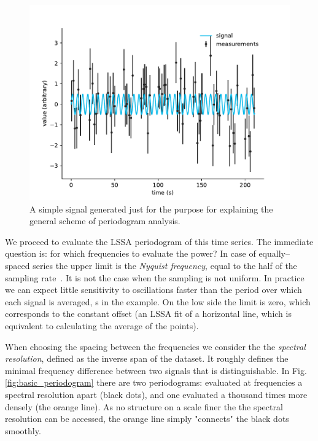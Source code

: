 \begin{figure}
  \centering \includegraphics[width=0.8\linewidth]{gfx/axions/basic_signal.pdf}
  \caption{A simple signal generated just for the purpose for explaining the general scheme of periodogram analysis.}
  \label{fig:basic_signal}
\end{figure}

We proceed to evaluate the LSSA periodogram of this time series. The immediate question is: for which frequencies to evaluate the power? In case of equally--spaced series the upper limit is the \emph{Nyquist frequency}, equal to the half of the sampling rate~\cite{Shannon1949}. It is not the case when the sampling is not uniform. In practice we can expect little sensitivity to oscillations faster than the period over which each signal is averaged, \unit[1]{s} in the example. On the low side the limit is zero, which corresponds to the constant offset (an LSSA fit of a horizontal line, which is equivalent to calculating the average of the points).

When choosing the spacing between the frequencies we consider the the \emph{spectral resolution}, defined as the inverse span of the dataset. It roughly defines the minimal frequency difference between two signals that is distinguishable. In Fig.\,\ref{fig:basic_periodogram} there are two periodograms: evaluated at frequencies a spectral resolution apart (black dots), and one evaluated a thousand times more densely (the orange line). As no structure on a scale finer the the spectral resolution can be accessed, the orange line simply "connects" the black dots smoothly.

